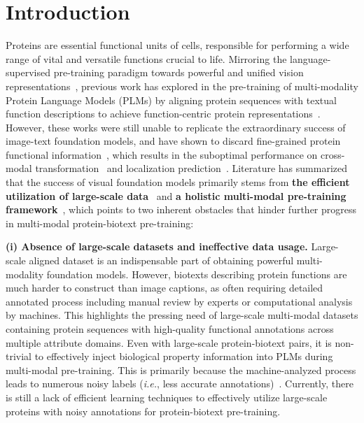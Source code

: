 \section{Introduction}
Proteins are essential functional units of cells, responsible for performing a wide range of vital and versatile functions crucial to life.
Mirroring the language-supervised pre-training paradigm towards powerful and unified vision representations~\cite{clip, DALLE2, ImageBind, BLIP2}, 
previous work has explored in the pre-training of multi-modality Protein Language Models (PLMs) by aligning protein sequences with textual function descriptions to achieve function-centric protein representations~\cite{OntoProtein, ProtST, ProteinCLIP, ProtET}.
However, these works were still unable to replicate the extraordinary success of image-text foundation models, and have shown to discard fine-grained protein functional information~\cite{ProteinCLIP}, which results in the suboptimal performance on cross-modal transformation~\cite{BioBridge} and localization prediction~\cite{ProtST}.
Literature has summarized that the success of visual foundation models primarily stems from \textbf{the efficient utilization of large-scale data}~\cite{clip, internVL} and \textbf{a holistic multi-modal pre-training framework}~\cite{KAD, PRIOR}, which points to two inherent obstacles that hinder further progress in multi-modal protein-biotext pre-training:

\noindent \textbf{(i) Absence of large-scale datasets and ineffective data usage.}
Large-scale aligned dataset is an indispensable part of obtaining powerful multi-modality foundation models. 
However, biotexts describing protein functions are much harder to construct than image captions, as often requiring detailed annotated process including manual review by experts or computational analysis by machines. 
This highlights the pressing need of large-scale multi-modal datasets containing protein sequences with high-quality functional annotations across multiple attribute domains.
Even with large-scale protein-biotext pairs, it is non-trivial to effectively inject biological property information into PLMs during multi-modal pre-training. This is primarily because the machine-analyzed process leads to numerous noisy labels (\textit{i.e.}, less accurate annotations)~\cite{Swiss_trEMBL}. Currently, there is still a lack of efficient learning techniques to effectively utilize large-scale proteins with noisy annotations for protein-biotext pre-training.

